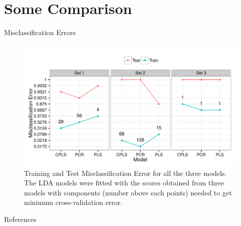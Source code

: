 \documentclass[newPxFont]{beamer}\usepackage[]{graphicx}\usepackage[]{color}
\makeatletter
\def\maxwidth{ %
  \ifdim\Gin@nat@width>\linewidth
    \linewidth
  \else
    \Gin@nat@width
  \fi
}
\newenvironment{knitrout}{}{} %
\makeatother
\begin{document}
\section{Some Comparison}
\begin{frame}[t]{Misclassification Errors}

\begin{knitrout}
\color{fgcolor}\begin{figure}
\includegraphics[width=\maxwidth]{figure/mscErrorPlot-1} \caption[Training and Test Misclassification Error for all the three models]{Training and Test Misclassification Error for all the three models. The LDA models were fitted with the scores obtained from three models with components (number above each points) needed to get minimum cross-validation error.}\label{fig:mscErrorPlot}
\end{figure}


\end{knitrout}
\end{frame}


\begin{frame}[c]{References}
\nocite{martens2001multivariate}
\printbibliography
\end{frame}
\end{document}
